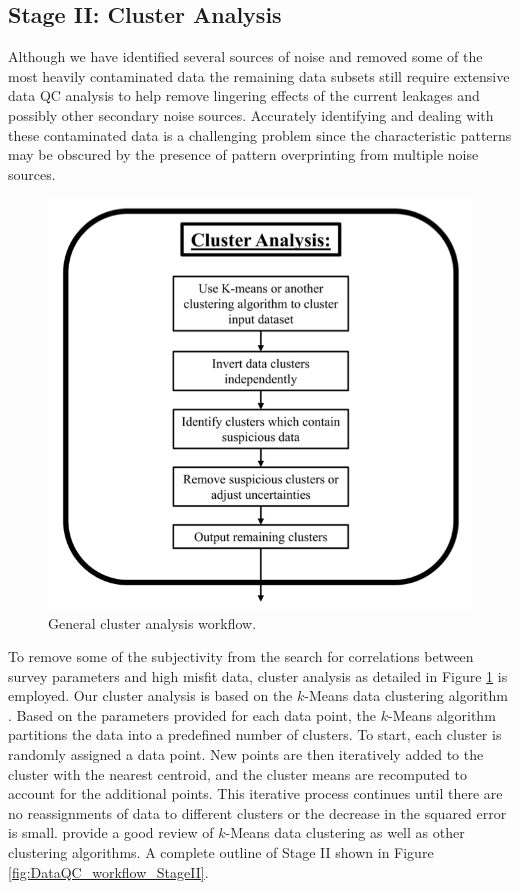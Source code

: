 \documentclass[final,authoryear,5p,times,twocolumn]{elsarticle}
\begin{document}
\subsection{Stage II: Cluster Analysis}
\label{Data_Quality_Control:StageII_Cluster_Analysis}

Although we have identified several sources of noise and removed some of the most heavily contaminated data the remaining data subsets still require extensive data QC analysis to help remove lingering effects of the current leakages and possibly other secondary noise sources. Accurately identifying and dealing with these contaminated data is a challenging problem since the characteristic patterns may be obscured by the presence of pattern overprinting from multiple noise sources.

\begin{figure} [!ht]
\begin{center}
   \includegraphics[trim=0cm 0cm 0cm 0cm, clip=true,width=0.75\linewidth]{./Figures/Fig10.png}
\end{center}
\caption{General cluster analysis workflow.}
\label{fig:DataQC_workflow_ClusterAnalysis}
\end{figure}

To remove some of the subjectivity from the search for correlations between survey parameters and high misfit data, cluster analysis as detailed in Figure \ref{fig:DataQC_workflow_ClusterAnalysis} is employed. Our cluster analysis is based on the $k$-Means data clustering algorithm \citep{MacQueen1967}. Based on the parameters provided for each data point, the $k$-Means algorithm partitions the data into a predefined number of clusters. To start, each cluster is randomly assigned a data point. New points are then iteratively added to the cluster with the nearest centroid, and the cluster means are recomputed to account for the additional points. This iterative process continues until there are no reassignments of data to different clusters or the decrease in the squared error is small. \cite{Jain1999} provide a good review of $k$-Means data clustering as well as other clustering algorithms. A complete outline of Stage II shown in Figure \ref{fig:DataQC_workflow_StageII}.
\end{document}
